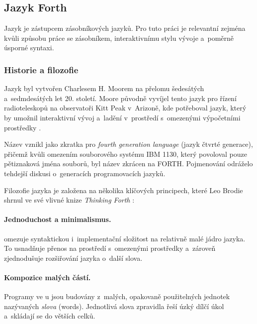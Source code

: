 
\subsection{Jazyk Forth}
\label{sec:forth}

Jazyk \Forth{} je zástupcem zásobníkových jazyků. Pro tuto práci je
relevantní zejména kvůli způsobu práce se zásobníkem, interaktivnímu
stylu vývoje a~poměrně úsporné syntaxi.


\subsubsection{Historie a filozofie}
\label{sec:forth-historie}

Jazyk \Forth{} byl vytvořen Charlesem H. Moorem na přelomu šedesátých
a~sedmdesátých let 20. století. Moore původně vyvíjel tento jazyk
pro řízení radioteleskopů na observatoři Kitt Peak v~Arizoně, kde
potřeboval jazyk, který by umožnil interaktivní vývoj a~ladění
v~prostředí s~omezenými výpočetními prostředky \autocite{moore1974}.

Název \Forth{} vznikl jako zkratka pro \emph{fourth generation language}
(jazyk čtvrté generace), přičemž kvůli omezením souborového systému
IBM 1130, který povoloval pouze pětiznaková jména souborů, byl název
zkrácen na FORTH. Pojmenování odráželo tehdejší diskusi o~generacích
programovacích jazyků.

Filozofie jazyka \Forth{} je založena na několika klíčových principech,
které Leo Brodie shrnul ve své vlivné knize \emph{Thinking Forth}
\autocite{brodie2004}:

\paragraph{Jednoduchost a minimalismus.}
\Forth{} omezuje syntaktickou i~implementační složitost na relativně
malé jádro jazyka. To usnadňuje přenos na prostředí s~omezenými prostředky
a~zároveň zjednodušuje rozšiřování jazyka o~další slova.

\paragraph{Kompozice malých částí.}
Programy ve \Forth{}u jsou budovány z~malých, opakovaně použitelných
jednotek nazývaných \emph{slova} (words). Jednotlivá slova zpravidla
řeší úzký dílčí úkol a~skládají se do větších celků.

